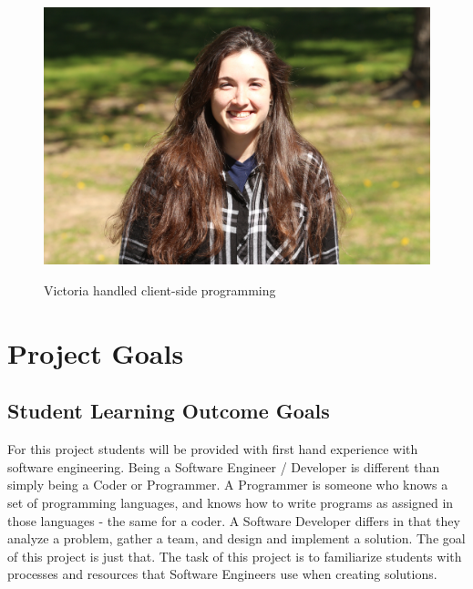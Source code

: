 \documentclass{article}
\begin{document}
\begin{minipage}{0.45\textwidth}
\begin{itemize}[label={}]
  					\begin{figure}[H]
  						\includegraphics[scale=.07]{victoria.jpg}\\
  							\captionsetup{labelformat=empty}
  							\caption {Victoria handled client-side programming}
  					\end{figure}
			\end{itemize}
		\end{minipage}%
		
	
	\newpage
	\section{Project Goals}\label{sec:goals}
		\subsection{Student Learning Outcome Goals}
			For this project students will be provided with first hand experience with software engineering. Being a Software
			Engineer / Developer is different than simply being a Coder or Programmer. A Programmer is someone who knows a set 
			of programming languages, and knows how to write programs as assigned in those languages - the same for a coder. 
			A Software Developer differs in that they analyze a problem, gather a team, and design and implement a solution. 
			The goal of this project is just that. The task of this project is to familiarize students with processes
			and resources that Software Engineers use when creating solutions.
			
\end{document}
